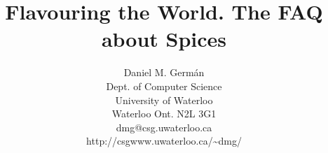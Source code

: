 \batchmode


\makeatletter
\title{Flavouring the World. The FAQ about Spices}

\author{Daniel M. Germ\'{a}n\\ Dept. of Computer Science\\ University of
  Waterloo\\  Waterloo Ont. N2L 3G1\\  
  dmg@csg.uwaterloo.ca\\ http://csgwww.uwaterloo.ca/\~{ }dmg/}


\renewcommand {\topfraction}{0.95}

\renewcommand {\textfraction}{0.02}

\makeatother
\newenvironment{tex2html_wrap}{}{}
\newwrite\lthtmlwrite
\def\lthtmltypeout#1{{\let\protect\string\immediate\write\lthtmlwrite{#1}}}%
\newbox\sizebox

